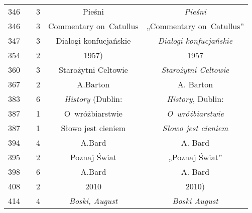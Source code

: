 \documentclass[a4paper,11pt]{article}
\begin{document}
\begin{center}
\begin{tabular}{|c|c|c|c|c|}
    346 & &  3 & Pieśni & \textit{Pieśni} \\
    346 & &  3 & Commentary on~Catullus & „Commentary on~Catullus” \\
    347 & &  3 & Dialogi konfucjańskie & \textit{Dialogi konfucjańskie} \\
    354 & &  2 & 1957) & 1957 \\
    360 & &  3 & Starożytni Celtowie & \textit{Starożytni Celtowie} \\
    367 & &  2 & A.Barton & A. Barton \\
    383 & &  6 & \textit{History} (Dublin: & \textit{History}, Dublin: \\
    387 & &  1 & O~wróżbiarstwie & \textit{O~wróżbiarstwie} \\
    387 & &  1 & Słowo jest cieniem & \textit{Słowo jest cieniem} \\
    394 & &  4 & A.Bard & A. Bard \\
    395 & &  2 & Poznaj Świat & „Poznaj Świat” \\
    398 & &  6 & A.Bard & A. Bard \\
    408 & &  2 & 2010 & 2010) \\
    414 & &  4 & \textit{Boski, August} & \textit{Boski August} \\
    \hline
  \end{tabular}





  \newpage


\end{center}
\end{document}
